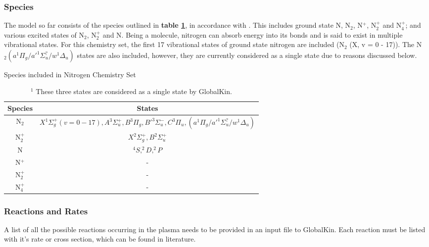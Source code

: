 \documentclass[11pt, oneside]{article}   	%
\begin{document}
\subsubsection{Species}

The model so far consists of the species outlined in \textbf{table \ref{table:Species}}, in accordance with \cite{Kutasi2016tuning}.
This includes ground state N, N$_2$, N$^+$, N$_2^+$ and N$_4^+$; and various excited states of N$_2$, N$_2^+$ and N.
Being a molecule, nitrogen can absorb energy into its bonds and is said to exist in multiple vibrational states.
For this chemistry set, the first 17 vibrational states of ground state nitrogen are included (N$_2$ (X, v = 0 - 17)).
The N$_2 (a^1\Pi_g/a'^1\Sigma^?_u/w^1\Delta_u)$ states are also included, however, they are currently considered as a single state due to reasons discussed below.



\begin{table}
\caption{Species included in Nitrogen Chemistry Set}
\begin{center}
\begin{tabular}{| c | c |}
\hline
Species & States \\
\hline\hline \hline
N$_2$ & $X^1\Sigma_g^+  (v = 0 - 17),  A^3\Sigma_u^+, B^3\Pi_g, B'^3\Sigma_u^-, C^3\Pi_u, (a^1\Pi_g/a'^1\Sigma^?_u/w^1\Delta_u)$\footnotemark  \\
\hline
N$_2^+$ & $X^2\Sigma_g^+, B^2\Sigma_u^+ $ \\
\hline
N & $^4S, ^2D,  ^2P$ \\
\hline
N$^+$ & - \\
\hline
N$_2^+$ & - \\
\hline
N$_4^+$ & - \\
\hline
\end{tabular}
\end{center}
\label{table:Species}
\caption*{$^1$ These three states are considered as a single state by GlobalKin.}
\end{table}




\subsubsection{Reactions and Rates}

A list of all the possible reactions occurring in the plasma needs to be provided in an input file to GlobalKin.
Each reaction must be listed with it's rate or cross section, which can be found in literature.
\end{document}
